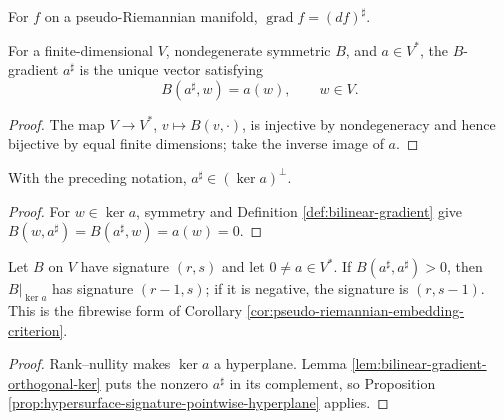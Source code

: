 For $f$ on a pseudo-Riemannian manifold, $\operatorname{grad}f=(df)^\sharp$.

\begin{definition}
\label{def:bilinear-gradient}





For a finite-dimensional $V$, nondegenerate symmetric $B$, and $a\in V^*$, the $B$-gradient $a^\sharp$ is the unique vector satisfying
\[
B(a^\sharp,w)=a(w),\qquad w\in V.
\]
\end{definition}
\begin{proof}

\sketch The map $V\to V^*$, $v\mapsto B(v,\cdot)$, is injective by nondegeneracy and hence bijective by equal finite dimensions; take the inverse image of $a$.
\end{proof}

\begin{lemma}
\label{lem:bilinear-gradient-orthogonal-ker}





With the preceding notation, $a^\sharp\in(\ker a)^\perp$.
\end{lemma}
\begin{proof}

\sketch For $w\in\ker a$, symmetry and Definition \ref{def:bilinear-gradient} give $B(w,a^\sharp)=B(a^\sharp,w)=a(w)=0$.
\end{proof}

\begin{proposition}
\label{prop:embedding-criterion-pointwise}





Let $B$ on $V$ have signature $(r,s)$ and let $0\ne a\in V^*$. If $B(a^\sharp,a^\sharp)>0$, then $B|_{\ker a}$ has signature $(r-1,s)$; if it is negative, the signature is $(r,s-1)$. This is the fibrewise form of Corollary \ref{cor:pseudo-riemannian-embedding-criterion}.
\end{proposition}
\begin{proof}

\sketch Rank--nullity makes $\ker a$ a hyperplane. Lemma \ref{lem:bilinear-gradient-orthogonal-ker} puts the nonzero $a^\sharp$ in its complement, so Proposition \ref{prop:hypersurface-signature-pointwise-hyperplane} applies.
\end{proof}


